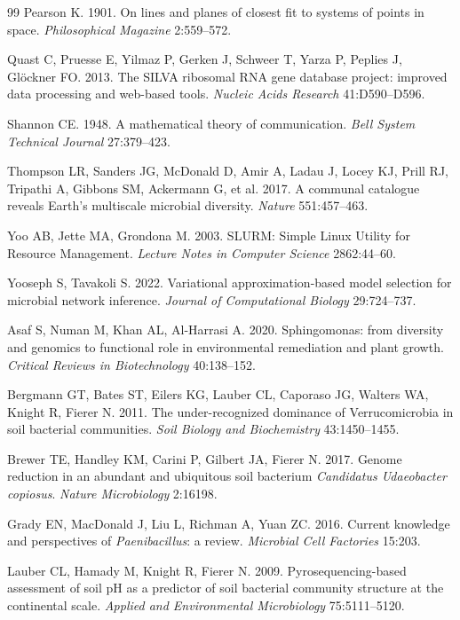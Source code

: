 \documentclass[12pt, oneside]{report}
\begin{document}
\begin{thebibliography}{99}
Pearson K. 1901.
On lines and planes of closest fit to systems of points in space.
\textit{Philosophical Magazine} 2:559--572.

Quast C, Pruesse E, Yilmaz P, Gerken J, Schweer T, Yarza P, Peplies J,
Gl\"{o}ckner FO. 2013.
The SILVA ribosomal RNA gene database project: improved data processing and
web-based tools.
\textit{Nucleic Acids Research} 41:D590--D596.

Shannon CE. 1948.
A mathematical theory of communication.
\textit{Bell System Technical Journal} 27:379--423.

Thompson LR, Sanders JG, McDonald D, Amir A, Ladau J, Locey KJ, Prill RJ,
Tripathi A, Gibbons SM, Ackermann G, et al. 2017.
A communal catalogue reveals Earth's multiscale microbial diversity.
\textit{Nature} 551:457--463.

Yoo AB, Jette MA, Grondona M. 2003.
SLURM: Simple Linux Utility for Resource Management.
\textit{Lecture Notes in Computer Science} 2862:44--60.

Yooseph S, Tavakoli S. 2022.
Variational approximation-based model selection for microbial network inference.
\textit{Journal of Computational Biology} 29:724--737.

Asaf S, Numan M, Khan AL, Al-Harrasi A. 2020.
Sphingomonas: from diversity and genomics to functional role in environmental
remediation and plant growth.
\textit{Critical Reviews in Biotechnology} 40:138--152.

Bergmann GT, Bates ST, Eilers KG, Lauber CL, Caporaso JG, Walters WA,
Knight R, Fierer N. 2011.
The under-recognized dominance of Verrucomicrobia in soil bacterial communities.
\textit{Soil Biology and Biochemistry} 43:1450--1455.

Brewer TE, Handley KM, Carini P, Gilbert JA, Fierer N. 2017.
Genome reduction in an abundant and ubiquitous soil bacterium
\textit{Candidatus Udaeobacter copiosus}.
\textit{Nature Microbiology} 2:16198.

Grady EN, MacDonald J, Liu L, Richman A, Yuan ZC. 2016.
Current knowledge and perspectives of \textit{Paenibacillus}: a review.
\textit{Microbial Cell Factories} 15:203.

Lauber CL, Hamady M, Knight R, Fierer N. 2009.
Pyrosequencing-based assessment of soil pH as a predictor of soil bacterial
community structure at the continental scale.
\textit{Applied and Environmental Microbiology} 75:5111--5120.


\end{thebibliography}
\end{document}
